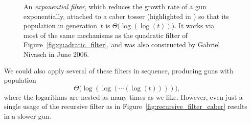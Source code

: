 \begin{figure}[!htb]
	\centering
	\caption{An \emph{exponential filter}, which reduces the growth rate of a gun exponentially, attached to a caber tosser (highlighted in ) so that its population in generation~$t$ is $\Theta\big(\log(\log(t))\big)$. It works via most of the same mechanisms as the quadratic filter of Figure~\ref{fig:quadratic_filter}, and was also constructed by Gabriel Nivasch in June 2006.}\label{fig:exponential_filter}
\end{figure}

We could also apply several of these filters in sequence, producing guns with population
\[
	\Theta\big(\log(\log(\cdots (\log(t))))\big),
\]
where the logarithms are nested as many times as we like. However, even just a single usage of the recursive filter as in Figure~\ref{fig:recursive_filter_caber} results in a slower gun.



